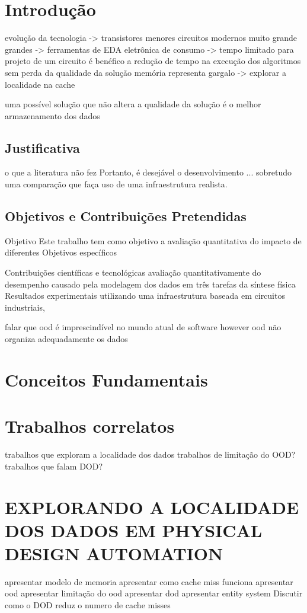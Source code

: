 \chapter{Introdução}
    evolução da tecnologia -> transistores menores
    circuitos modernos muito grande grandes -> ferramentas de EDA 
    eletrônica de consumo -> tempo limitado para projeto de um circuito
    é benéfico a redução de tempo na execução dos algoritmos sem perda da qualidade da solução 
    memória representa gargalo -> explorar a localidade na cache
    
    uma possível solução que não altera a qualidade da solução é o melhor armazenamento dos dados

    \section{Justificativa}
    o que a literatura não fez
    Portanto, é desejável o desenvolvimento ... sobretudo uma comparação que faça uso de uma infraestrutura realista.
    
    \section{Objetivos e Contribuições Pretendidas}
        Objetivo
            Este trabalho tem como objetivo a avaliação quantitativa do impacto de diferentes
        Objetivos específicos
        
        Contribuições científicas e tecnológicas
            avaliação quantitativamente do desempenho causado pela modelagem dos dados em três tarefas da síntese física
            Resultados experimentais utilizando uma infraestrutura baseada em circuitos industriais,


falar que ood é imprescindível no mundo atual de software
however
ood não organiza adequadamente os dados


\chapter{Conceitos Fundamentais}


\chapter{Trabalhos correlatos}
    trabalhos que exploram a localidade dos dados
    trabalhos de limitação do OOD?
    trabalhos que falam DOD?

\chapter{EXPLORANDO A LOCALIDADE DOS DADOS EM PHYSICAL DESIGN AUTOMATION}
    apresentar modelo de memoria
    apresentar como cache miss funciona
    apresentar ood
    apresentar limitação do ood
    apresentar dod
    apresentar entity system
    Discutir como o DOD reduz o numero de cache misses
    
